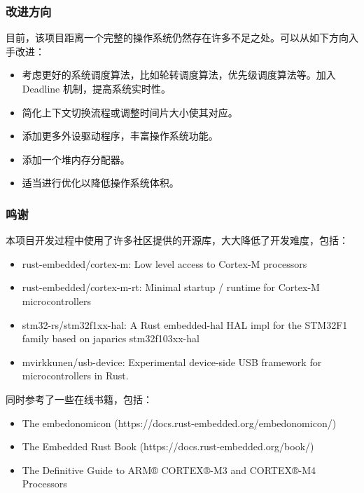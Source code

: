\documentclass[aspectratio=169]{ctexbeamer}
\begin{document}
\begin{frame}
    \frametitle{改进方向}

    目前，该项目距离一个完整的操作系统仍然存在许多不足之处。可以从如下方向入手改进：
    
    \begin{itemize}
        \item 考虑更好的系统调度算法，比如轮转调度算法，优先级调度算法等。加入 Deadline 机制，提高系统实时性。
        \item 简化上下文切换流程或调整时间片大小使其对应。
        \item 添加更多外设驱动程序，丰富操作系统功能。
        \item 添加一个堆内存分配器。
        \item 适当进行优化以降低操作系统体积。
    \end{itemize}
\end{frame}

\begin{frame}

    \frametitle{鸣谢}

    本项目开发过程中使用了许多社区提供的开源库，大大降低了开发难度，包括：
    \begin{itemize}
        \item rust-embedded/cortex-m: Low level access to Cortex-M processors
        \item rust-embedded/cortex-m-rt: Minimal startup / runtime for Cortex-M microcontrollers
        \item stm32-rs/stm32f1xx-hal: A Rust embedded-hal HAL impl for the STM32F1 family based on japarics stm32f103xx-hal
        \item mvirkkunen/usb-device: Experimental device-side USB framework for microcontrollers in Rust.
    \end{itemize}
    
    同时参考了一些在线书籍，包括：
    \begin{itemize}
        \item The embedonomicon (https://docs.rust-embedded.org/embedonomicon/)
        \item The Embedded Rust Book (https://docs.rust-embedded.org/book/)
        \item The Definitive Guide to ARM® CORTEX®-M3 and CORTEX®-M4 Processors
    \end{itemize}
    
\end{frame}
\end{document}
